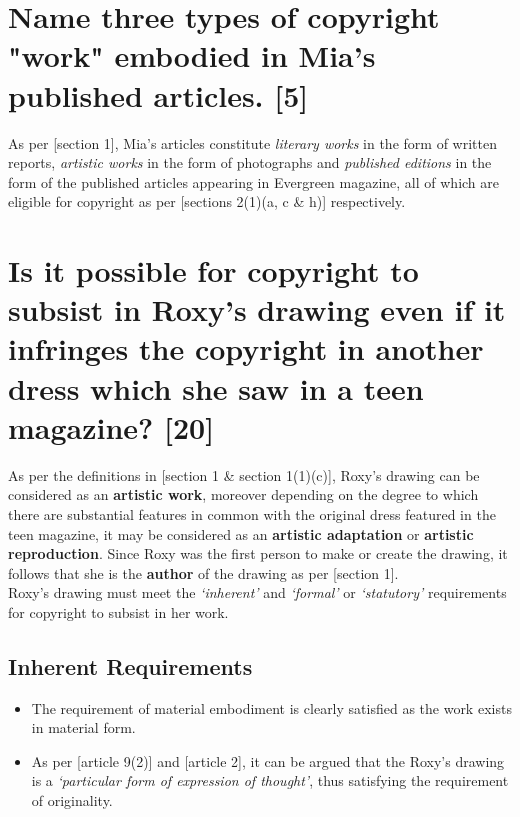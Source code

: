 \documentclass[11pt]{article}
\begin{document}
\section{Name three types of copyright "work" embodied in Mia's published articles. [5]}
\label{sec:org5b7c351}

As per [section 1]\cite{rsa78_copyrightact}, Mia's articles constitute \emph{literary
works} in the form of written reports, \emph{artistic works} in the form of photographs
and \emph{published editions} in the form of the published articles appearing in
Evergreen magazine, all of which are eligible for copyright as per [sections
2(1)(a, c \& h)]\cite{rsa78_copyrightact} respectively.

\section{Is it possible for copyright to subsist in Roxy's drawing even if it infringes the copyright in another dress which she saw in a teen magazine? [20]}
\label{sec:org23678ff}
As per the definitions in [section 1 \& section 1(1)(c)]\cite{rsa78_copyrightact},
Roxy's drawing can be considered as an \textbf{artistic work}, moreover depending on
the degree to which there are substantial features in common with the original
dress featured in the teen magazine, it may be considered as an \textbf{artistic
adaptation} or \textbf{artistic reproduction}. Since Roxy was the first person to make or
create the drawing, it follows that she is the \textbf{author} of the drawing as per [section 1]\cite{rsa78_copyrightact}.\\

Roxy's drawing must meet the \emph{`inherent'} and \emph{`formal'} or
\emph{`statutory'} requirements for copyright to subsist in her work.
\subsection{Inherent Requirements}
\label{sec:orge9bc30b}
\begin{itemize}
\item The requirement of material embodiment is clearly satisfied as the
work exists in material form.
\item As per [article 9(2)]\cite{wto17_trips} and
[article 2]\cite{wipo96_copyright_treaty}, it can be argued that the
Roxy's drawing is a \emph{`particular form of expression of
thought'}, thus satisfying the requirement of originality.
\end{itemize}
\end{document}
